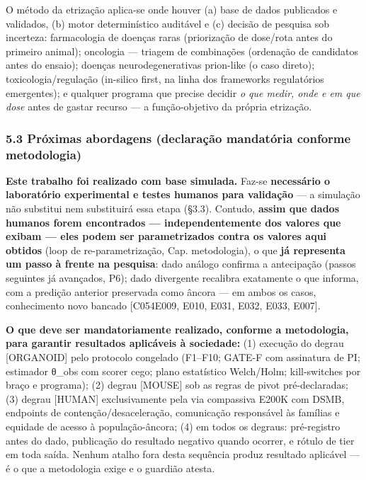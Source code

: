 \documentclass[
  10pt,
]{article}
\begin{document}
O método da etrização aplica-se onde houver (a) base de dados publicados
e validados, (b) motor determinístico auditável e (c) decisão de
pesquisa sob incerteza: farmacologia de doenças raras (priorização de
dose/rota antes do primeiro animal); oncologia --- triagem de
combinações (ordenação de candidatos antes do ensaio); doenças
neurodegenerativas prion-like (o caso direto); toxicologia/regulação
(in-silico first, na linha dos frameworks regulatórios emergentes); e
qualquer programa que precise decidir \emph{o que medir, onde e em que
dose} antes de gastar recurso --- a função-objetivo da própria
etrização.

\hypertarget{pruxf3ximas-abordagens-declarauxe7uxe3o-mandatuxf3ria-conforme-metodologia}{%
\subsubsection{5.3 Próximas abordagens (declaração mandatória conforme
metodologia)}\label{pruxf3ximas-abordagens-declarauxe7uxe3o-mandatuxf3ria-conforme-metodologia}}

\textbf{Este trabalho foi realizado com base simulada.} Faz-se
\textbf{necessário o laboratório experimental e testes humanos para
validação} --- a simulação não substitui nem substituirá essa etapa
(§3.3). Contudo, \textbf{assim que dados humanos forem encontrados ---
independentemente dos valores que exibam --- eles podem ser
parametrizados contra os valores aqui obtidos} (loop de
re-parametrização, Cap. metodologia), o que \textbf{já representa um
passo à frente na pesquisa}: dado análogo confirma a antecipação (passos
seguintes já avançados, P6); dado divergente recalibra exatamente o que
informa, com a predição anterior preservada como âncora --- em ambos os
casos, conhecimento novo bancado {[}C054\textbar E009, E010, E031, E032,
E033, E007{]}.

\textbf{O que deve ser mandatoriamente realizado, conforme a
metodologia, para garantir resultados aplicáveis à sociedade:} (1)
execução do degrau {[}ORGANOID{]} pelo protocolo congelado (F1--F10;
GATE-F com assinatura de PI; estimador θ\_obs com scorer cego; plano
estatístico Welch/Holm; kill-switches por braço e programa); (2) degrau
{[}MOUSE{]} sob as regras de pivot pré-declaradas; (3) degrau
{[}HUMAN{]} exclusivamente pela via compassiva E200K com DSMB, endpoints
de contenção/desaceleração, comunicação responsável às famílias e
equidade de acesso à população-âncora; (4) em todos os degraus:
pré-registro antes do dado, publicação do resultado negativo quando
ocorrer, e rótulo de tier em toda saída. Nenhum atalho fora desta
sequência produz resultado aplicável --- é o que a metodologia exige e o
guardião atesta.
\end{document}

